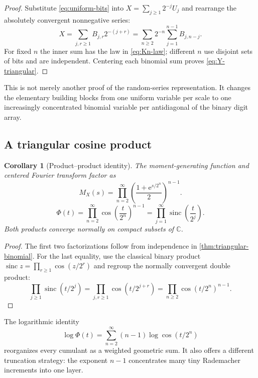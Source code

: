 \documentclass[11pt,oneside]{article}
\newtheorem{corollary}[theorem]{Corollary}
\theoremstyle{definition}
\theoremstyle{remark}
\newcommand{\C}{\mathbb C}
\newcommand{\sinc}{\operatorname{sinc}}
\newcommand{\e}{\mathrm e}
\newcommand{\1}{\mathbf 1}
\begin{document}
\begin{proof}
Substitute \eqref{eq:uniform-bits} into
$X=\sum_{j\ge1}2^{-j}U_j$ and rearrange the absolutely convergent nonnegative
series:
\[
 X=\sum_{j,r\ge1}B_{j,r}2^{-(j+r)}
  =\sum_{n\ge2}2^{-n}\sum_{j=1}^{n-1}B_{j,n-j}.
\]
For fixed $n$ the inner sum has the law in \eqref{eq:Kn-law}; different
$n$ use disjoint sets of bits and are independent.  Centering each binomial
sum proves \eqref{eq:Y-triangular}.
\end{proof}

This is not merely another proof of the random-series representation.  It
changes the elementary building blocks from one uniform variable per scale to
one increasingly concentrated binomial variable per antidiagonal of the
binary digit array.

\subsection{A triangular cosine product}

\begin{corollary}[Product--product identity]
\label{cor:triangular-product}
The moment-generating function and centered Fourier transform factor as
\begin{equation}
 M_X(s)=\prod_{n=2}^\infty
   \left(\frac{1+\e^{s/2^n}}{2}\right)^{n-1}.            \label{eq:triangular-mgf}
\end{equation}
\begin{equation}
 \boxed{\displaystyle
 \Phi(t)=\prod_{n=2}^\infty
   \cos\!\left(\frac{t}{2^n}\right)^{n-1}
 =\prod_{j=1}^\infty
   \sinc\!\left(\frac{t}{2^j}\right).}                 \label{eq:triangular-cos-product}
\end{equation}
Both products converge normally on compact subsets of $\C$.
\end{corollary}

\begin{proof}
The first two factorizations follow from independence in
\cref{thm:triangular-binomial}.  For the last equality, use the classical
binary product
$\sinc z=\prod_{r\ge1}\cos(z/2^r)$ and regroup the normally convergent double
product:
\[
 \prod_{j\ge1}\sinc(t/2^j)
 =\prod_{j,r\ge1}\cos(t/2^{j+r})
 =\prod_{n\ge2}\cos(t/2^n)^{n-1}.
\]
\end{proof}

The logarithmic identity
\begin{equation}
 \log\Phi(t)=\sum_{n=2}^\infty(n-1)
              \log\cos(t/2^n)                           \label{eq:triangular-log}
\end{equation}
reorganizes every cumulant as a weighted geometric sum.  It also offers a
different truncation strategy: the exponent $n-1$ concentrates many tiny
Rademacher increments into one layer.
\end{document}
